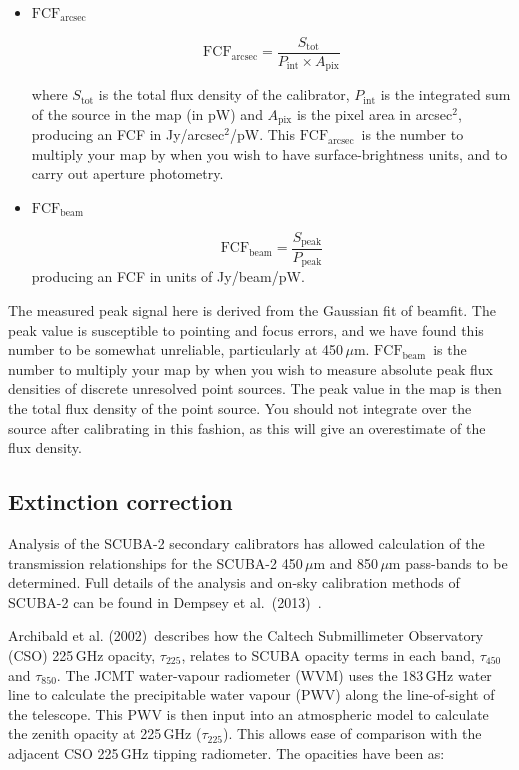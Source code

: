 \documentclass[twoside,11pt]{article}
\newcommand{\xref}[3]{#1}
\newcommand{\xlabel}[1]{}
\renewcommand{\_}{\texttt{\symbol{95}}}
\newcommand{\fcfb}{$\mathrm{FCF_{beam}}$}
\newcommand{\fcfa}{$\mathrm{FCF_{arcsec}}$}
\newcommand{\task}[1]{\textsf{#1}}
\newcommand{\beamfit}{\xref{\task{beamfit}}{sun95}{BEAMFIT}}
\begin{document}
\begin{itemize}

\item{\textbf{\fcfa}}

\begin{equation}
\label{eq:fcf_arcsec}
\mathrm{FCF_{arcsec}} = \frac{S_\mathrm{tot}}{P_\mathrm{int} \times
A_\mathrm{pix}}
\end{equation}

where $S_\mathrm{tot}$ is the total flux density of the calibrator,
$P_\mathrm{int}$ is the integrated sum of the source in the map (in
pW) and $A_\mathrm{pix}$ is the pixel area in arcsec$^2$, producing an
FCF in Jy/arcsec$^2$/pW. This \fcfa\ is the number to
multiply your map by when you wish to have surface-brightness units,
and to carry out aperture photometry.

\item{\textbf{\fcfb}}

\begin{equation}
\label{eq:fcf_beam}
\mathrm{FCF_{beam}} = \frac{S_\mathrm{{peak}}}{P_\mathrm{peak}}
\end{equation}
producing an FCF in units of Jy/beam/pW.
\end{itemize}

The measured peak signal here is derived from the Gaussian fit of
\beamfit. The peak value is susceptible to pointing and focus errors,
and we have found this number to be somewhat unreliable, particularly
at 450\,$\mu$m. \fcfb\ is the number to multiply your
map by when you wish to measure absolute peak flux densities of
discrete unresolved point sources. The peak value in the map is then
the total flux density of the point source. You should not integrate
over the source after calibrating in this fashion, as this will give
an overestimate of the flux density.


\subsection{\xlabel{extinction}Extinction correction}

Analysis of the SCUBA-2 secondary calibrators has allowed calculation
of the transmission relationships for the SCUBA-2 450\,$\mu$m and
850\,$\mu$m pass-bands to be determined. Full details of the analysis
and on-sky calibration methods of SCUBA-2 can be found in Dempsey et
al.\ (2013)~\cite{dempsey12}\cite{dempsey-spie}.

Archibald et al. (2002)\,\cite{archibald} describes how the Caltech
Submillimeter Observatory (CSO) 225\,GHz opacity, $\tau_{225}$,
relates to SCUBA opacity terms in each band, $\tau_{450}$ and
$\tau_{850}$. The JCMT water-vapour radiometer (WVM) uses the 183\,GHz
water line to calculate the precipitable water vapour (PWV) along the
line-of-sight of the telescope. This PWV is then input into an
atmospheric model to calculate the zenith opacity at 225\,GHz
($\tau_{225}$). This allows ease of comparison with the adjacent CSO
225\,GHz tipping radiometer. The opacities have been as:
\end{document}
